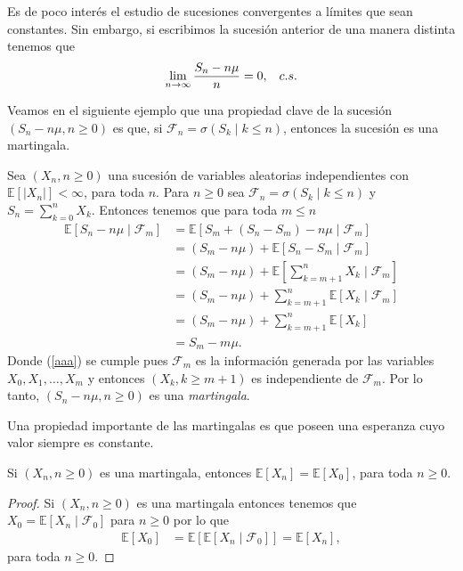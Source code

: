 Es de poco interés el estudio de sucesiones convergentes a límites que sean constantes. Sin embargo, si escribimos la sucesión anterior de una manera distinta tenemos que
\begin{align*}
	\lim_{n \rightarrow \infty} \frac{S_n - n\mu}{n} = 0, \hspace{0.3cm} c.s.
\end{align*}

Veamos en el siguiente ejemplo que una propiedad clave de la sucesión $(S_n - n\mu, n \geq 0)$ es que, si $\mathcal{F}_n = \sigma ( S_k \mid k \leq n )$, entonces la sucesión es una martingala.

\begin{example}
	Sea $(X_n, n \geq 0)$ una sucesión de variables aleatorias independientes con $\mathbb{E}[|X_n|] < \infty$, para toda $n$. Para $n \geq 0$ sea $\mathcal{F}_n = \sigma ( S_k \mid k \leq n )$ y $S_n = \sum_{k=0}^n X_k$. Entonces tenemos que para toda $m \leq n$
	\begin{align}
		\mathbb{E}[S_n - n\mu \mid \mathcal{F}_m] & = \mathbb{E}[S_m + (S_n - S_m) - n\mu \mid \mathcal{F}_m] \nonumber \\
		& = (S_m - n\mu) + \mathbb{E}[S_n - S_m \mid \mathcal{F}_m] \nonumber \\
		& = (S_m - n\mu) + \mathbb{E}\left[\sum_{k = m+1}^{n} X_k \mid \mathcal{F}_m\right] \nonumber \\
		& = (S_m - n\mu) + \sum_{k = m+1}^{n} \mathbb{E}[X_k \mid \mathcal{F}_m] \nonumber \\
		& = (S_m - n\mu) + \sum_{k = m+1}^{n} \mathbb{E}[X_k]  \label{aaa} \\
		& = S_m - m\mu. \nonumber
	\end{align}
	Donde (\ref{aaa}) se cumple pues $\mathcal{F}_m$ es la información generada por las variables $X_0, X_1, \ldots, X_m$ y entonces $(X_k, k \geq m+1)$ es independiente de $\mathcal{F}_m$. Por lo tanto, $(S_n - n\mu, n \geq 0)$ es una \emph{martingala}.
\end{example}

Una propiedad importante de las martingalas es que poseen una esperanza cuyo valor siempre es constante.
\begin{proposition} \label{martin}
	Si $(X_n, n \geq 0)$ es una martingala, entonces $\mathbb{E}[X_n] = \mathbb{E}[X_0]$, para toda $n \geq 0$.
\end{proposition}
\begin{proof}
	Si $(X_n, n \geq 0)$ es una martingala entonces tenemos que $X_0 = \mathbb{E}[X_n \mid \mathcal{F}_0]$ para $n \geq 0$ por lo que
	\begin{align*}
		\mathbb{E}[X_0] & = \mathbb{E}[\mathbb{E}[X_n \mid \mathcal{F}_0]] = \mathbb{E}[X_n],
	\end{align*}
para toda $n \geq 0$.
\end{proof}

